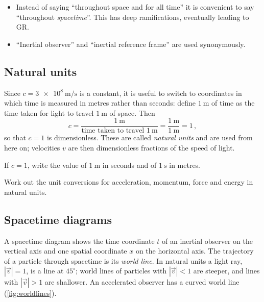 \begin{remark}
    \begin{itemize}[leftmargin=*, nosep]
        \item Instead of saying ``throughout space and for all time'' it is convenient to say
              ``throughout \emph{spacetime}''. This has deep ramifications, eventually leading to GR.
        \item ``Inertial observer'' and ``inertial reference frame'' are used synonymously.
    \end{itemize}
\end{remark}

\subsection{Natural units}
\label{sec:sr_units}

Since $c = \SI{3e8}{\metre\per\second}$ is a constant, it is useful to switch to coordinates in
which time is measured in metres rather than seconds: define $\SI{1}{\metre}$ of time as the time
taken for light to travel $\SI{1}{\metre}$ of space. Then
\begin{equation}
    c = \frac{\SI{1}{\metre}}{\text{time taken to travel } \SI{1}{\metre}}
      = \frac{\SI{1}{\metre}}{\SI{1}{\metre}} = 1 \, ,
\end{equation}
so that $c = 1$ is dimensionless. These are called \emph{natural units} and are used from here on;
velocities $v$ are then dimensionless fractions of the speed of light.

\begin{exercise}
    If $c = 1$, write the value of $\SI{1}{\metre}$ in seconds and of $\SI{1}{\second}$ in metres.
\end{exercise}

\begin{exercise}
    Work out the unit conversions for acceleration, momentum, force and energy in natural units.
\end{exercise}

\subsection{Spacetime diagrams}
\label{sec:sr_diagrams}

A spacetime diagram shows the time coordinate $t$ of an inertial observer on the vertical axis
and one spatial coordinate $x$ on the horizontal axis. The trajectory of a particle through
spacetime is its \emph{world line}. In natural units a light ray, $|\vec{v}| = 1$, is a line at
$45^\circ$; world lines of particles with $|\vec{v}| < 1$ are steeper, and lines with
$|\vec{v}| > 1$ are shallower. An accelerated observer has a curved world line
(\cref{fig:worldlines}).

